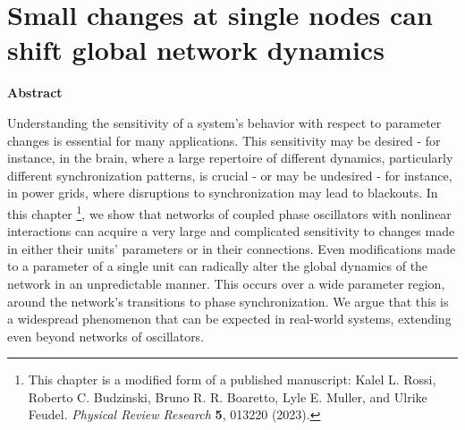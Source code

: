 \chapter{Small changes at single nodes can shift global network dynamics} \label{chap:malleability}



\vspace{1.5em}
\noindent
{\large\textbf{Abstract}} \vspace{0.2cm}

Understanding the sensitivity of a system's behavior with respect to parameter changes is essential for many applications. This sensitivity may be desired - for instance, in the brain, where a large repertoire of different dynamics, particularly different synchronization patterns, is crucial - or may be undesired - for instance, in power grids, where disruptions to synchronization may lead to blackouts. In this chapter \footnote[1]{This chapter is a modified form of a published manuscript: Kalel L. Rossi, Roberto C. Budzinski, Bruno R. R. Boaretto, Lyle E. Muller, and Ulrike Feudel. \textit{Physical Review Research} \textbf{5}, 013220 (2023).}, we show that networks of coupled phase oscillators with nonlinear interactions can acquire a very large and complicated sensitivity to changes made in either their units' parameters or in their connections. Even modifications made to a parameter of a single unit can radically alter the global dynamics of the network in an unpredictable manner. This occurs over a wide parameter region, around the network's transitions to phase synchronization. We argue that this is a widespread phenomenon that can be expected in real-world systems, extending even beyond networks of oscillators. 
\vspace{1.5em}



